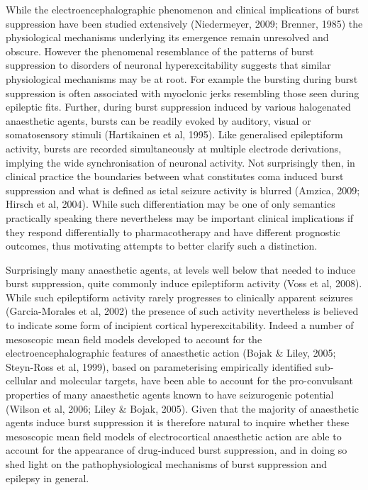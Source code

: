 \documentclass[a4paper,12pt]{article}
\begin{document}
While the electroencephalographic phenomenon and clinical
implications of burst suppression have been studied extensively
(Niedermeyer, 2009; Brenner, 1985) the physiological mechanisms
underlying its emergence remain unresolved and obscure. However the
phenomenal resemblance of the patterns of burst suppression to
disorders of neuronal hyperexcitability suggests that similar
physiological mechanisms may be at root. For example the bursting
during burst suppression is often associated with myoclonic jerks
resembling those seen during epileptic fits. Further, during burst
suppression induced by various halogenated anaesthetic agents, bursts
can be readily evoked by auditory, visual or somatosensory stimuli
(Hartikainen et al, 1995). Like generalised epileptiform activity, bursts
are recorded simultaneously at multiple electrode derivations, implying
the wide synchronisation of neuronal activity. Not surprisingly then, in
clinical practice the boundaries between what constitutes coma
induced burst suppression and what is defined as ictal seizure activity
is blurred (Amzica, 2009; Hirsch et al, 2004). While such
differentiation may be one of only semantics practically speaking there
nevertheless may be important clinical implications if they respond
differentially to pharmacotherapy and have different prognostic
outcomes, thus motivating attempts to better clarify such a
distinction.

Surprisingly many anaesthetic agents, at levels well below that needed
to induce burst suppression, quite commonly induce epileptiform
activity (Voss et al, 2008). While such epileptiform activity rarely
progresses to clinically apparent seizures (Garcia-Morales et al, 2002)
the presence of such activity nevertheless is believed to indicate some
form of incipient cortical hyperexcitability. Indeed a number of
mesoscopic mean field models developed to account for the
electroencephalographic features of anaesthetic action (Bojak \& Liley,
2005; Steyn-Ross et al, 1999), based on parameterising empirically
identified sub-cellular and molecular targets, have been able to account
for the pro-convulsant properties of many anaesthetic agents known
to have seizurogenic potential (Wilson et al, 2006; Liley \& Bojak,
2005). Given that the majority of anaesthetic agents induce burst
suppression it is therefore natural to inquire whether these mesoscopic
mean field models of electrocortical anaesthetic action are able to
account for the appearance of drug-induced burst suppression, and in
doing so shed light on the pathophysiological mechanisms of burst
suppression and epilepsy in general.
\end{document}
